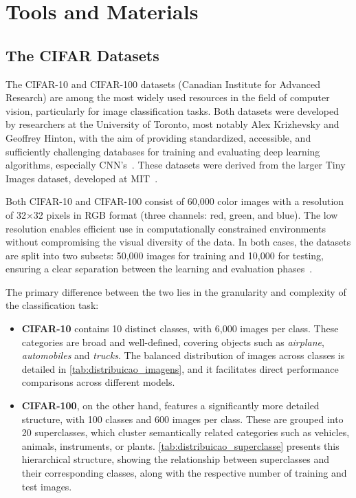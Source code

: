 \documentclass[journal,article,submit,pdftex,moreauthors]{Definitions/mdpi}
\begin{document}
\section{Tools and Materials}
\subsection{The CIFAR Datasets}

The CIFAR-10 and CIFAR-100 datasets (Canadian Institute for Advanced Research) are among the most widely used resources in the field of computer vision, particularly for image classification tasks. Both datasets were developed by researchers at the University of Toronto, most notably Alex Krizhevsky and Geoffrey Hinton, with the aim of providing standardized, accessible, and sufficiently challenging databases for training and evaluating deep learning algorithms, especially CNN's~\cite{krizhevsky2009}. These datasets were derived from the larger Tiny Images dataset, developed at MIT~\cite{torralba2008}.

Both CIFAR-10 and CIFAR-100 consist of 60,000 color images with a resolution of 32×32 pixels in RGB format (three channels: red, green, and blue). The low resolution enables efficient use in computationally constrained environments without compromising the visual diversity of the data. In both cases, the datasets are split into two subsets: 50,000 images for training and 10,000 for testing, ensuring a clear separation between the learning and evaluation phases~\cite{krizhevsky2009}.

The primary difference between the two lies in the granularity and complexity of the classification task:

\begin{itemize}
  \item \textbf{CIFAR-10} contains 10 distinct classes, with 6,000 images per class. These categories are broad and well-defined, covering objects such as \textit{airplane}, \textit{automobiles} and \textit{trucks}. The balanced distribution of images across classes is detailed in \autoref{tab:distribuicao_imagens}, and it facilitates direct performance comparisons across different models.

  \item \textbf{CIFAR-100}, on the other hand, features a significantly more detailed structure, with 100 classes and 600 images per class. These are grouped into 20 superclasses, which cluster semantically related categories such as vehicles, animals, instruments, or plants. \autoref{tab:distribuicao_superclasse} presents this hierarchical structure, showing the relationship between superclasses and their corresponding classes, along with the respective number of training and test images. 
\end{itemize}
\end{document}
